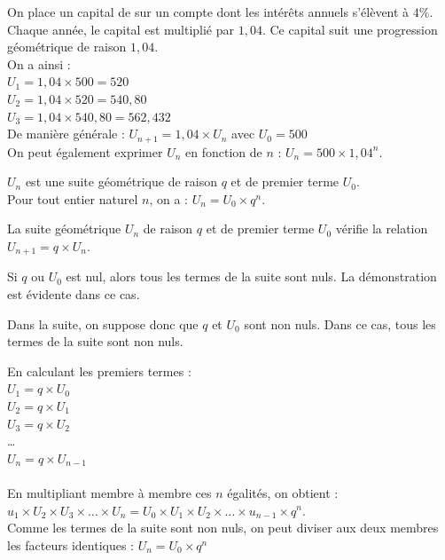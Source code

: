 \begin{exempleTitre}
    On place un capital de  sur un compte dont les intérêts annuels s'élèvent à $4\%$.
    Chaque année, le capital est multiplié par $1,04$.
    Ce capital suit une progression géométrique de raison $1,04$.\\
    
    On a ainsi :\\ 
    $U_1=1,04\times 500=520$\\		
    $U_2=1,04\times 520=540,80$\\
    $U_3=1,04\times 540,80=562,432$\\	
    De manière générale : $U_{n+1}=1,04\times U_n$ avec $U_0=500$\\ 
    On peut également exprimer $U_n$ en fonction de $n$ : $U_n= 500\times1,04^n$. 
\end{exempleTitre}

\begin{propriete}
    $U_n$ est une suite géométrique de raison $q$ et de premier terme $U_0$.\\
    Pour tout entier naturel $n$, on a : $U_n= U_0\times q^n$.
\end{propriete}

\begin{demonstration}
    La suite géométrique $U_n$ de raison $q$ et de premier terme $U_0$ vérifie la relation
    $U_{n+1}=q\times U_n$.
    \begin{itemDem}
    	\item Si $q$ ou $U_0$ est nul, alors tous les termes de la suite sont nuls. La démonstration est évidente dans ce cas.
    	\item Dans la suite, on suppose donc que $q$ et $U_0$ sont non nuls. Dans ce cas, tous les termes de la suite sont non nuls.
    \end{itemDem}
    En calculant les premiers termes :\\ 
    $U_1=q\times U_0$\\
    $U_2=q\times U_1$\\
    $U_3=q\times U_2$\\
    …\\
    $U_n=q\times U_{n-1}$\\
    \\
    En multipliant membre à membre ces $n$ égalités, on obtient :
    $u_1\times U_2\times U_3\times …\times U_n=U_0\times U_1\times U_2\times …\times u_{n-1}\times q^n$.\\
    Comme les termes de la suite sont non nuls, on peut diviser aux deux membres les facteurs identiques : $U_n=U_0\times q^n$
\end{demonstration}

